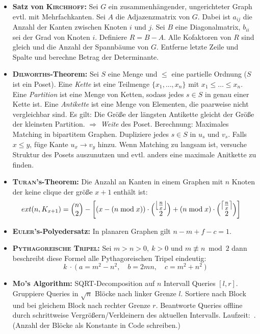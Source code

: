 \begin{itemize}
	\item \textbf{Satz von \textsc{Kirchhoff}:}
	Sei $G$ ein zusammenhängender, ungerichteter Graph evtl. mit Mehrfachkanten.
	Sei $A$ die Adjazenzmatrix von $G$.
	Dabei ist $a_{ij}$ die Anzahl der Kanten zwischen Knoten $i$ und $j$.
	Sei $B$ eine Diagonalmatrix, $b_{ii}$ sei der Grad von Knoten $i$.
	Definiere $R = B - A$.
	Alle Kofaktoren von $R$ sind gleich und die Anzahl der Spannbäume von $G$.
	\newline
	Entferne letzte Zeile und Spalte und berechne Betrag der Determinante.

	\item \textbf{\textsc{Dilworths}-Theorem:}
	Sei $S$ eine Menge und $\leq$ eine partielle Ordnung ($S$ ist ein Poset).
	Eine \emph{Kette} ist eine Teilmenge $\{x_1,\ldots,x_n\}$ mit $x_1 \leq \ldots \leq x_n$.
	Eine \emph{Partition} ist eine Menge von Ketten, sodass jedes $s \in S$ in genau einer Kette ist.
	Eine \emph{Antikette} ist eine Menge von Elementen, die paarweise nicht vergleichbar sind.
	\newline
	Es gilt: Die Größe der längsten Antikette gleicht der Größe der kleinsten Partition.
	$\Rightarrow$ \emph{Weite} des Poset.
	\newline
	Berechnung: Maximales Matching in bipartitem Graphen.
	Dupliziere jedes $s \in S$ in $u_s$ und $v_s$.
	Falls $x \leq y$, füge Kante $u_x \to v_y$ hinzu.
	Wenn Matching zu langsam ist, versuche Struktur des Posets auszunutzen und evtl. anders eine maximale Anitkette zu finden. 
	
	\item \textbf{\textsc{Turan}'s-Theorem:}
	Die Anzahl an Kanten in einem Graphen mit $n$ Knoten der keine clique der größe $x+1$ enthält ist:
	\begin{align*}
	ext(n, K_{x+1}) &= \Bigl( \begin{matrix} n \\ 2 \end{matrix} \Bigr) - \left[\left(x - (n \bmod x)\right) \cdot \Bigl( \begin{matrix} \left\lfloor\frac{n}{x}\right\rfloor \\ 2 \end{matrix} \Bigr) + \left(n\bmod x\right)  \cdot \Bigl( \begin{matrix} \left\lceil\frac{n}{x}\right\rceil \\ 2 \end{matrix} \Bigr)\right]
	\end{align*}
	
	\item \textbf{\textsc{Euler}'s-Polyedersatz:}
	In planaren Graphen gilt $n-m+f-c=1$.
	
	\item \textbf{\textsc{Pythagoreische Tripel}:}
	Sei $m>n>0,~k>0$ und $m\not\equiv n \bmod 2$ dann beschreibt diese Formel alle Pythagoreischen Tripel eindeutig:
	\[k~\cdot~\Big(~a=m^2-n^2,\quad b=2mn,\quad c=m^2+n^2~\Big)\]
	
	\item \textbf{\textsc{Mo}'s Algorithm:}
	SQRT-Decomposition auf $n$ Intervall Queries $[l,r]$.
	Gruppiere Queries in $\sqrt{n}$ Blöcke nach linker Grenze $l$.
	Sortiere nach Block und bei gleichem Block nach rechter Grenze $r$.
	Beantworte Queries offline durch schrittweise Vergrößern/Verkleinern des aktuellen Intervalls.
	Laufzeit:~.
	(Anzahl der Blöcke als Konstante in Code schreiben.)
	

\end{itemize}
